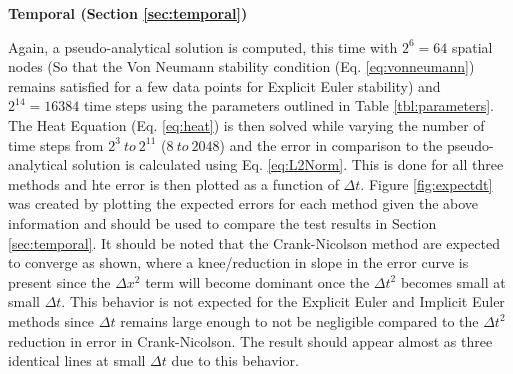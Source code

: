\documentclass[10pt, letter, showtrims]{extarticle}
\begin{document}
		\noindent
		\textbf{Temporal (Section \ref{sec:temporal})}
		
		\noindent
		Again, a pseudo-analytical solution is computed, this time with $2^{6} = 64$ spatial nodes (So that the Von Neumann stability condition (Eq. \ref{eq:vonneumann}) remains satisfied for a few data points for Explicit Euler stability) and $2^{14} = 16384$ time steps using the parameters outlined in Table \ref{tbl:parameters}. The Heat Equation (Eq. \ref{eq:heat}) is then solved while varying the number of time steps from $2^{3}\ to\ 2^{11}$ ($8\ to\ 2048$) and the error in comparison to the pseudo-analytical solution is calculated using Eq. \ref{eq:L2Norm}. This is done for all three methods and hte error is then plotted as a function of $\Delta t$. Figure \ref{fig:expectdt} was created by plotting the expected errors for each method given the above information and should be used to compare the test results in Section \ref{sec:temporal}. It should be noted that the Crank-Nicolson method are expected to converge as shown, where a knee/reduction in slope in the error curve is present since the $\Delta x^{2}$ term will become dominant once the $\Delta t^{2}$ becomes small at small $\Delta t$. This behavior is not expected for the Explicit Euler and Implicit Euler methods since $\Delta t$ remains large enough to not be negligible compared to the $\Delta t^{2}$ reduction in error in Crank-Nicolson. The result should appear almost as three identical lines at small $\Delta t$ due to this behavior.
		
\end{document}

